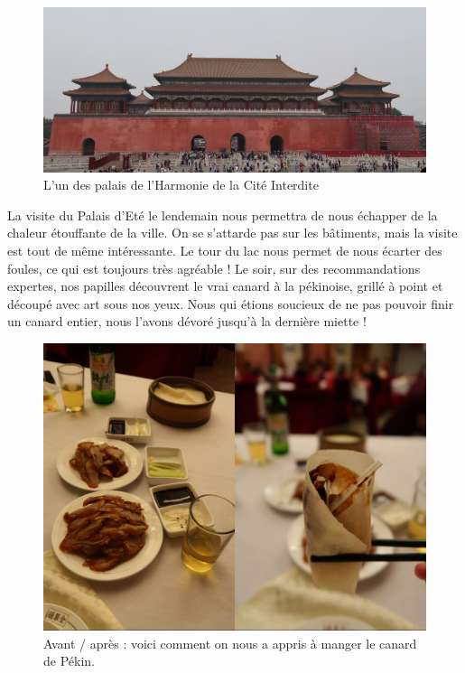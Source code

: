 \begin{figure}
\centering
\includegraphics{images/20180616_cite.JPG}
\caption{L'un des palais de l'Harmonie de la Cité Interdite}
\end{figure}

La visite du Palais d'Eté le lendemain nous permettra de nous échapper
de la chaleur étouffante de la ville. On se s'attarde pas sur les
bâtiments, mais la visite est tout de même intéressante. Le tour du lac
nous permet de nous écarter des foules, ce qui est toujours très
agréable ! Le soir, sur des recommandations expertes, nos papilles
découvrent le vrai canard à la pékinoise, grillé à point et découpé avec
art sous nos yeux. Nous qui étions soucieux de ne pas pouvoir finir un
canard entier, nous l'avons dévoré jusqu'à la dernière miette !

\begin{figure}
\centering
\includegraphics{images/20180616_canard.jpg}
\caption{Avant / après : voici comment on nous a appris à manger le
canard de Pékin.}
\end{figure}

